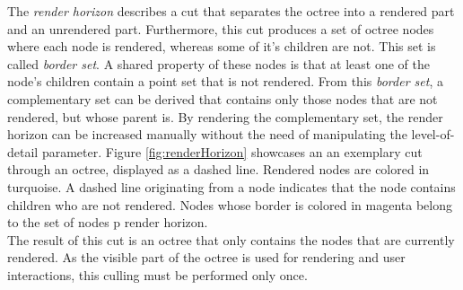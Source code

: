The \textit{render horizon} describes a cut that separates the octree into a rendered part and an unrendered part. Furthermore, this cut produces a set of octree nodes where each node is rendered, whereas some of it's children are not. This set is called \textit{border set}. A shared property of these nodes is that at least one of the node's children contain a point set that is not rendered. From this \textit{border set}, a complementary set can be derived that contains only those nodes that are not rendered, but whose parent is. By rendering the complementary set, the render horizon can be increased manually without the need of manipulating the level-of-detail parameter. Figure \ref{fig:renderHorizon} showcases an an exemplary cut through an octree, displayed as a dashed line. Rendered nodes are colored in turquoise. A dashed line originating from a node indicates that the node contains children who are not rendered. Nodes whose border is colored in magenta belong to the set of nodes p render horizon. 
\\
The result of this cut is an octree that only contains the nodes that are currently rendered. As the visible part of the octree is used for rendering and user interactions, this culling must be performed only once. 